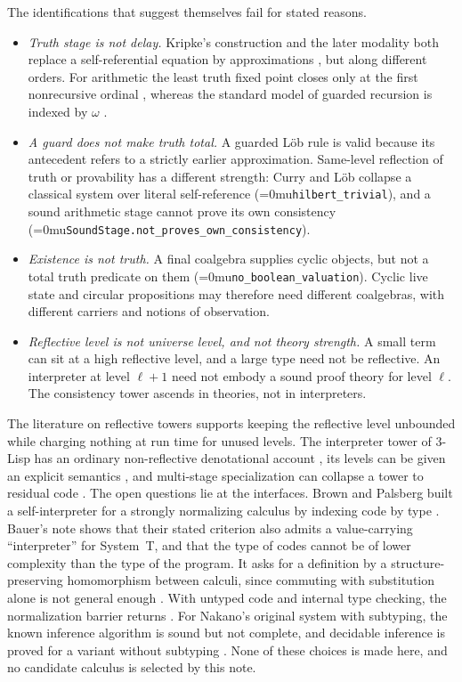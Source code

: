 \documentclass[11pt]{article}
\newcommand{\leanname}[1]{\textup{\Urlmuskip=0mu\relax\nolinkurl{#1}}}
\theoremstyle{definition}
\theoremstyle{remark}
\begin{document}
The identifications that suggest themselves fail for stated reasons.
\begin{itemize}[leftmargin=*]
\item \emph{Truth stage is not delay.}  Kripke's construction and the later
  modality both replace a self-referential equation by approximations
  \cite{KripkeTruth,NakanoModality}, but along different orders.  For
  arithmetic the least truth fixed point closes only at the first nonrecursive
  ordinal \cite{KripkeTruth}, whereas the standard model of guarded recursion
  is indexed by $\omega$ \cite{BirkedalGuardedTopos}.
\item \emph{A guard does not make truth total.}  A guarded L\"ob rule is valid
  because its antecedent refers to a strictly earlier approximation.
  Same-level reflection of truth or provability has a different strength:
  Curry and L\"ob collapse a classical system over literal self-reference
  (\leanname{hilbert_trivial}), and a sound arithmetic stage cannot prove its
  own consistency (\leanname{SoundStage.not_proves_own_consistency}).
\item \emph{Existence is not truth.}  A final coalgebra supplies cyclic objects,
  but not a total truth predicate on them (\leanname{no_boolean_valuation}).
  Cyclic live state and circular propositions may therefore need different
  coalgebras, with different carriers and notions of observation.
\item \emph{Reflective level is not universe level, and not theory strength.}
  A small term can sit at a high reflective level, and a large type need not
  be reflective.  An interpreter at level $\ell+1$ need not embody a sound
  proof theory for level $\ell$.  The consistency tower ascends in theories, not
  in interpreters.
\end{itemize}

The literature on reflective towers supports keeping the reflective level
unbounded while charging nothing at run time for unused levels.  The
interpreter tower of 3-Lisp \cite{SmithReflection} has an ordinary
non-reflective denotational account \cite{WandFriedmanTower}, its levels can be given an explicit
semantics \cite{DanvyMalmkjaerTower}, and multi-stage specialization can
collapse a tower to residual code \cite{AminRompfCollapsing}.  The open
questions lie at the interfaces.  Brown and Palsberg built a self-interpreter
for a strongly normalizing calculus by indexing code by type
\cite{BrownPalsbergSelfInterpreter}.  Bauer's note
shows that their stated criterion also admits a value-carrying
``interpreter'' for System~T, and that the type of codes cannot be of lower
complexity than the type of the program.  It asks for a definition by a
structure-preserving homomorphism between calculi, since commuting with
substitution alone is not general enough \cite{BauerSelfInterpreterT}.  With
untyped code and internal type checking, the normalization barrier returns
\cite{DingZhangBarrier}.  For Nakano's original system with subtyping, the
known inference algorithm is sound but not complete, and decidable inference
is proved for a variant without subtyping \cite{SeveriLightModality}.  None of these choices is made here, and no
candidate calculus is selected by this note.
\end{document}

